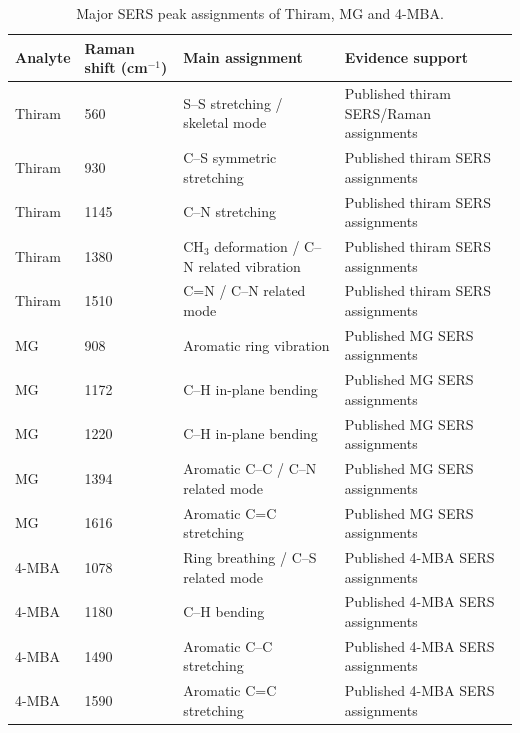 \begin{table}[htbp]
\centering
\caption{Major SERS peak assignments of Thiram, MG and 4-MBA.}
\label{tab:s2_peak_assignment}
\scriptsize
\begin{tabularx}{\textwidth}{L{1.7cm}L{1.5cm}Y L{3.2cm}}
\toprule
Analyte & Raman shift (cm$^{-1}$) & Main assignment & Evidence support \\
\midrule
Thiram & 560 & S--S stretching / skeletal mode & Published thiram SERS/Raman assignments \\
Thiram & 930 & C--S symmetric stretching & Published thiram SERS assignments \\
Thiram & 1145 & C--N stretching & Published thiram SERS assignments \\
Thiram & 1380 & CH$_3$ deformation / C--N related vibration & Published thiram SERS assignments \\
Thiram & 1510 & C=N / C--N related mode & Published thiram SERS assignments \\
MG & 908 & Aromatic ring vibration & Published MG SERS assignments \\
MG & 1172 & C--H in-plane bending & Published MG SERS assignments \\
MG & 1220 & C--H in-plane bending & Published MG SERS assignments \\
MG & 1394 & Aromatic C--C / C--N related mode & Published MG SERS assignments \\
MG & 1616 & Aromatic C=C stretching & Published MG SERS assignments \\
4-MBA & 1078 & Ring breathing / C--S related mode & Published 4-MBA SERS assignments \\
4-MBA & 1180 & C--H bending & Published 4-MBA SERS assignments \\
4-MBA & 1490 & Aromatic C--C stretching & Published 4-MBA SERS assignments \\
4-MBA & 1590 & Aromatic C=C stretching & Published 4-MBA SERS assignments \\
\bottomrule
\end{tabularx}
\end{table}
